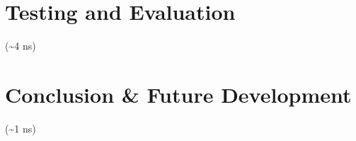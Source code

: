     \section{}


\chapter{Testing and Evaluation}
    (\textasciitilde4 ns)

\chapter{Conclusion \& Future Development}
    (\textasciitilde1 ns)
